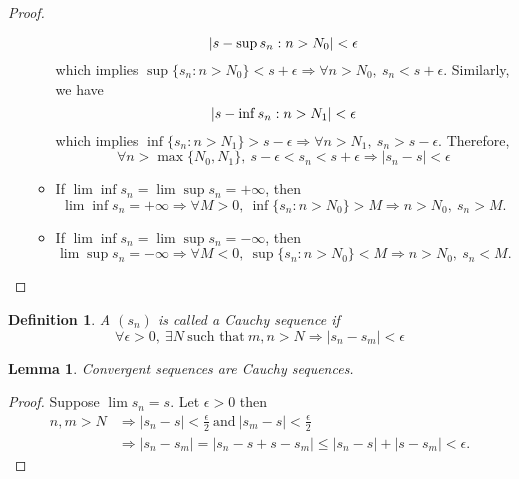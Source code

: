 \documentclass[12pt, lettersize]{book}
\newtheorem{dfn}[thm]{Definition}
\newtheorem{lem}[thm]{Lemma}
\begin{document}
\begin{proof}
\begin{enumerate}[(i)]
\begin{itemize}
\begin{displaymath}
					  	\abs{s-\sup{s_n:n>N_0}}<\epsilon
					  \end{displaymath}
				  	  which implies $\sup\{s_n: n>N_0\}<s+\epsilon\Rightarrow\forall n>N_0,\ s_n<s+\epsilon$.
				  	  Similarly, we have 
				  	  \begin{displaymath}
				  	  	\abs{s-\inf{s_n:n>N_1}}<\epsilon
				  	  \end{displaymath}
			  	  	  which implies $\inf\{s_n: n>N_1\}>s-\epsilon\Rightarrow\forall n>N_1,\ s_n>s-\epsilon$.
			  	  	  Therefore,
			  	  	  \begin{displaymath}
			  	  	  	\forall n>\max\{N_0,N_1\},\ s-\epsilon<s_n<s+\epsilon\Rightarrow |s_n-s|<\epsilon	
			  	  	  \end{displaymath}
		  	  	  	  \item If $\lim\inf s_n=\lim\sup s_n=+\infty$, then
		  	  	  	  \begin{displaymath}
		  	  	  	  	\lim\inf s_n=+\infty\Rightarrow \forall M>0,\ \inf\{s_n:n>N_0\}>M\Rightarrow n>N_0,\ s_n>M.
		  	  	  	  \end{displaymath}
	  	  	  	  	  \item If $\lim\inf s_n=\lim\sup s_n=-\infty$, then
	  	  	  	  	  \begin{displaymath}
	  	  	  	  	  	\lim\sup s_n=-\infty\Rightarrow \forall M<0,\ \sup\{s_n:n>N_0\}<M\Rightarrow n>N_0,\ s_n<M.
	  	  	  	  	  \end{displaymath}
				  \end{itemize}
		\end{enumerate}
		\end{proof}
		
		\begin{dfn}\label{def:cauchy-seq}
		A $(s_n)$ is called a \emph{Cauchy sequence} if 
		\begin{displaymath}
			\forall\epsilon>0,\ \exists N\ \text{such that}\ m,n>N\Rightarrow|s_n-s_m|<\epsilon
		\end{displaymath}
		\end{dfn}
		\begin{lem}
		Convergent sequences are Cauchy sequences.
		\end{lem}
		\begin{proof}
		Suppose $\lim s_n=s$. Let $\epsilon>0$ then
		\begin{align*}
			n,m>N &\Rightarrow |s_n-s|<\frac{\epsilon}{2}\ \text{and}\ |s_m-s|<\frac{\epsilon}{2}\\
				  &\Rightarrow |s_n-s_m|=|s_n-s+s-s_m|\leq|s_n-s|+|s-s_m|<\epsilon.
		\end{align*}
		\end{proof}
		
\end{document}
